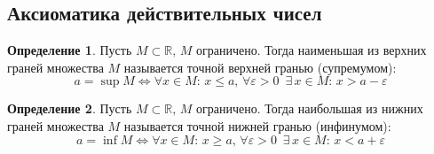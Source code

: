 \documentclass[12pt]{article}
\theoremstyle{definition}
\newtheorem{definition}{Определение}
\newcommand{\R}{\mathbb{R}}
\begin{document}
\subsection{Аксиоматика действительных чисел}

\begin{definition}
    Пусть $M \subset \R,\,M$ ограничено. Тогда наименьшая из верхних граней множества $M$ называется точной верхней гранью (супремумом):
    $$a=\sup M\Longleftrightarrow \forall x \in M:\, x \leq a,\, \forall \varepsilon>0\,\,\, \exists\, x \in M:\, x>a-\varepsilon$$
\end{definition}
\begin{definition}
    Пусть $M \subset \R,\,M$ ограничено. Тогда наибольшая из нижних граней множества $M$ называется точной нижней гранью (инфинумом):
    $$a=\inf M\Longleftrightarrow \forall x \in M:\, x \geq a,\, \forall \varepsilon>0\,\,\, \exists\, x \in M:\, x<a+\varepsilon$$
\end{definition}
\end{document}

